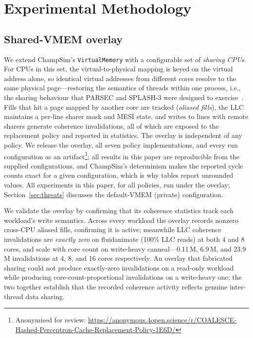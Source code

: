 \documentclass[conference]{IEEEtran}
\begin{document}
\section{Experimental Methodology}
\label{sec:methodology}

\subsection{Shared-VMEM overlay}

We extend ChampSim's \texttt{VirtualMemory} with a configurable set of \emph{sharing CPUs}. For CPUs in this set, the virtual-to-physical mapping is keyed on the virtual address alone, so identical virtual addresses from different cores resolve to the same physical page---restoring the semantics of threads within one process, i.e., the sharing behaviour that PARSEC and SPLASH-3 were designed to exercise~\cite{bienia2008parsec,sakalis2016splash3}. Fills that hit a page mapped by another core are tracked (\emph{aliased fills}), the LLC maintains a per-line sharer mask and MESI state, and writes to lines with remote sharers generate coherence invalidations, all of which are exposed to the replacement policy and reported in statistics. The overlay is independent of any policy. We release the overlay, all seven policy implementations, and every run configuration as an artifact\footnote{Anonymised for review: \url{https://anonymous.4open.science/r/COALESCE-Hashed-Perceptron-Cache-Replacement-Policy-1E6D/}}; all results in this paper are reproducible from the supplied configurations, and ChampSim's determinism makes the reported cycle counts exact for a given configuration, which is why tables report unrounded values. All experiments in this paper, for all policies, run under the overlay; Section~\ref{sec:threats} discusses the default-VMEM (private) configuration.

We validate the overlay by confirming that its coherence statistics track each workload's write semantics. Across every workload the overlay records nonzero cross-CPU aliased fills, confirming it is active; meanwhile LLC coherence invalidations are \emph{exactly zero} on fluidanimate (100\% LLC reads) at both 4 and 8 cores, and scale with core count on write-heavy canneal---0.11\,M, 6.9\,M, and 23.9\,M invalidations at 4, 8, and 16 cores respectively. An overlay that fabricated sharing could not produce exactly-zero invalidations on a read-only workload while producing core-count-proportional invalidations on a write-heavy one; the two together establish that the recorded coherence activity reflects genuine inter-thread data sharing.
\end{document}
